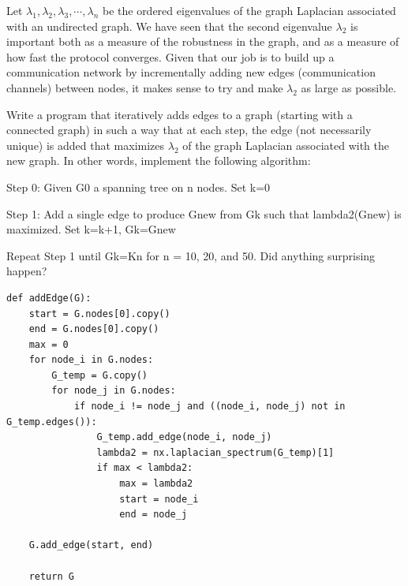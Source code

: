 \documentclass{article}
\begin{document}
\begin{problem}
Let $\lambda_1, \lambda_2, \lambda_3, \cdots, \lambda_n $ be the ordered eigenvalues of the graph Laplacian associated with an undirected graph. We have seen that the second eigenvalue $\lambda_2$ is important both as a measure of the robustness in the graph, and as a measure of how fast the protocol converges. Given that our job is to build up a communication network by incrementally adding new edges (communication channels) between nodes, it makes sense to try and make $\lambda_2$ as large as possible.
    
Write a program that iteratively adds edges to a graph (starting with a connected graph) in such a way that at each step, the edge (not necessarily unique) is added that maximizes $\lambda_2$ of the graph Laplacian associated with the new graph. In other words, implement the following algorithm: 

Step 0: Given G0 a spanning tree on n nodes. Set k=0

Step 1: Add a single edge to produce Gnew from Gk such that lambda2(Gnew) is maximized. Set k=k+1, Gk=Gnew

Repeat Step 1 until Gk=Kn for n = 10, 20, and 50. Did anything surprising happen?

\begin{verbatim}
def addEdge(G):
    start = G.nodes[0].copy()
    end = G.nodes[0].copy()
    max = 0    
    for node_i in G.nodes:
        G_temp = G.copy()
        for node_j in G.nodes:
            if node_i != node_j and ((node_i, node_j) not in G_temp.edges()):
                G_temp.add_edge(node_i, node_j)
                lambda2 = nx.laplacian_spectrum(G_temp)[1]
                if max < lambda2:
                    max = lambda2
                    start = node_i
                    end = node_j
    
    G.add_edge(start, end)
              
    return G
\end{verbatim}


\end{problem}
\end{document}
